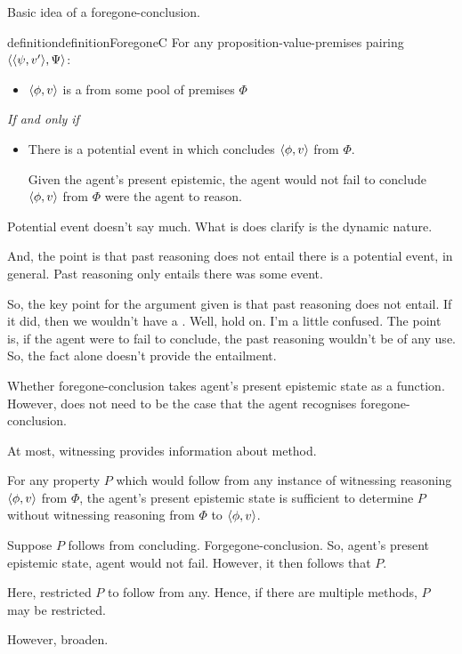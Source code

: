 \begin{note}
  Basic idea of a foregone-conclusion.

  \begin{restatable}{definition}{definitionForegoneC}
    For any proposition-value-premises pairing \(\langle \langle \psi, v' \rangle, \Psi \rangle\):
    \begin{itemize}
    \item
      \(\langle \phi, v \rangle\) is a \emph{} from some pool of premises \(\Phi\)
    \end{itemize}
    \emph{If and only if}
    \begin{itemize}
    \item
      There is a potential event in which \vAgent{} concludes \(\langle \phi, v \rangle\) from \(\Phi\).

      Given the agent's present epistemic, the agent would not fail to conclude \(\langle \phi, v \rangle\) from \(\Phi\) were the agent to reason.
    \end{itemize}
  \end{restatable}

  {
    Potential event doesn't say much.
    What is does clarify is the dynamic nature.

    And, the point is that past reasoning does not entail there is a potential event, in general.
    Past reasoning only entails there was some event.

    So, the key point for the argument given is that past reasoning does not entail.
    If it did, then we wouldn't have a \requ{}.
    Well, hold on.
    I'm a little confused.
    The point is, if the agent were to fail to conclude, the past reasoning wouldn't be of any use.
    So, the fact alone doesn't provide the entailment.
  }

  Whether foregone-conclusion takes agent's present epistemic state as a function.
  However, does not need to be the case that the agent recognises foregone-conclusion.

  At most, witnessing provides information about method.

  For any property \(P\) which would follow from any instance of witnessing reasoning \(\langle \phi, v \rangle\) from \(\Phi\), the agent's present epistemic state is sufficient to determine \(P\) without witnessing reasoning from \(\Phi\) to \(\langle \phi, v \rangle\).

  Suppose \(P\) follows from concluding.
  Forgegone-conclusion.
  So, agent's present epistemic state, agent would not fail.
  However, it then follows that \(P\).

  Here, restricted \(P\) to follow from any.
  Hence, if there are multiple methods, \(P\) may be restricted.

  However, broaden.
\end{note}

